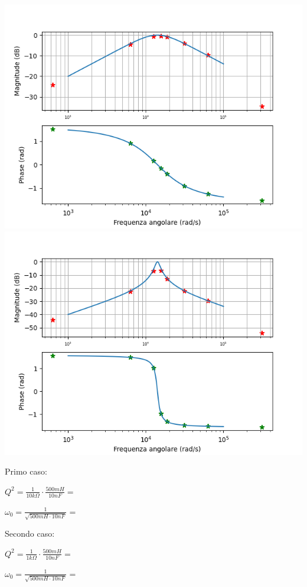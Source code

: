     \begin{minipage}{.625\linewidth}
        \includegraphics[width = 10.5 cm]{bode.png}
        \includegraphics[width = 10.5 cm]{bode2.png}
    \end{minipage}
    \begin{minipage}{.4\linewidth}
        Primo caso:\par
        $Q^2=\frac{1}{10k\Omega} \cdot \frac{500mH}{10nF} = $ \par
        $\omega_0 = \frac{1}{\sqrt{500mH\cdot 10nF}}$ = 
        \\ \par
        Secondo caso:\par
        $Q^2=\frac{1}{1k\Omega} \cdot \frac{500mH}{10nF} = $ \par
        $\omega_0 = \frac{1}{\sqrt{500mH \cdot 10nF}}$ = 
    \end{minipage}

